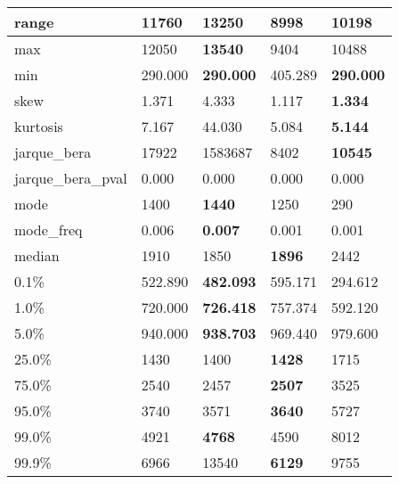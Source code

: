 \begin{table}[H]
\begin{tabular}{|l|m{10em}|m{10em}|m{10em}|m{10em}|}
\hline range & 11760 & \bfseries 13250 & \cellcolor[rgb]{0.9, 0.54, 0.52} 8998 & 10198 \\
\hline max & 12050 & \bfseries 13540 & \cellcolor[rgb]{0.9, 0.54, 0.52} 9404 & 10488 \\
\hline min & 290.000 & \bfseries 290.000 & \cellcolor[rgb]{0.9, 0.54, 0.52} 405.289 & \bfseries 290.000 \\
\hline skew & 1.371 & \cellcolor[rgb]{0.9, 0.54, 0.52} 4.333 & 1.117 & \bfseries 1.334 \\
\hline kurtosis & 7.167 & \cellcolor[rgb]{0.9, 0.54, 0.52} 44.030 & 5.084 & \bfseries 5.144 \\
\hline jarque\_bera & 17922 & \cellcolor[rgb]{0.9, 0.54, 0.52} 1583687 & 8402 & \bfseries 10545 \\
\hline jarque\_bera\_pval & 0.000 & 0.000 & 0.000 & 0.000 \\
\hline mode & 1400 & \bfseries 1440 & 1250 & \cellcolor[rgb]{0.9, 0.54, 0.52} 290 \\
\hline mode\_freq & 0.006 & \bfseries 0.007 & \cellcolor[rgb]{0.9, 0.54, 0.52} 0.001 & 0.001 \\
\hline median & 1910 & 1850 & \bfseries 1896 & \cellcolor[rgb]{0.9, 0.54, 0.52} 2442 \\
\hline 0.1\% & 522.890 & \bfseries 482.093 & 595.171 & \cellcolor[rgb]{0.9, 0.54, 0.52} 294.612 \\
\hline 1.0\% & 720.000 & \bfseries 726.418 & 757.374 & \cellcolor[rgb]{0.9, 0.54, 0.52} 592.120 \\
\hline 5.0\% & 940.000 & \bfseries 938.703 & 969.440 & \cellcolor[rgb]{0.9, 0.54, 0.52} 979.600 \\
\hline 25.0\% & 1430 & 1400 & \bfseries 1428 & \cellcolor[rgb]{0.9, 0.54, 0.52} 1715 \\
\hline 75.0\% & 2540 & 2457 & \bfseries 2507 & \cellcolor[rgb]{0.9, 0.54, 0.52} 3525 \\
\hline 95.0\% & 3740 & 3571 & \bfseries 3640 & \cellcolor[rgb]{0.9, 0.54, 0.52} 5727 \\
\hline 99.0\% & 4921 & \bfseries 4768 & 4590 & \cellcolor[rgb]{0.9, 0.54, 0.52} 8012 \\
\hline 99.9\% & 6966 & \cellcolor[rgb]{0.9, 0.54, 0.52} 13540 & \bfseries 6129 & 9755 \\
\hline
\end{tabular}
\end{table}

